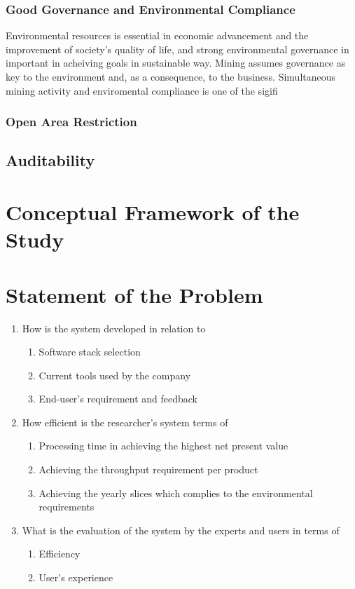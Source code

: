 \documentclass[12pt]{report}
\begin{document}
\subsubsection{Good Governance and Environmental Compliance}
Environmental resources is essential in economic advancement and the improvement of society's quality of life, and strong environmental governance in important in acheiving goals in sustainable way. 
Mining assumes governance as key to the environment and, as a consequence, to the business.
Simultaneous mining activity and enviromental compliance is one of the sigifi



\subsubsection{Open Area Restriction}


\subsection{Auditability}

\section{Conceptual Framework of the Study}

\section{Statement of the Problem}

\begin{enumerate}
    \item How is the system developed in relation to
            \begin{enumerate}
                \item Software stack selection
                \item Current tools used by the company
                \item End-user's requirement and feedback
            \end{enumerate}
    \item How efficient is the researcher's system terms of
        \begin{enumerate}
            \item Processing time in achieving the highest net present value
            \item Achieving the throughput requirement per product
            \item Achieving the yearly slices which complies to the environmental requirements
        \end{enumerate}
    \item What is the evaluation of the system by the experts and users in terms of
        \begin{enumerate}
            \item Efficiency
            \item User's experience
        \end{enumerate}
\end{enumerate}
\end{document}
